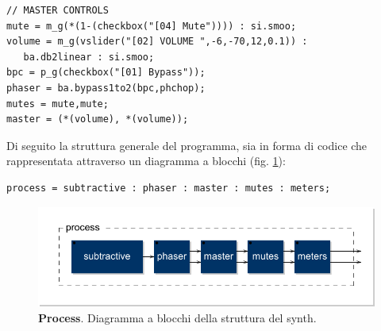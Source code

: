 \documentclass[
	a4paper,
	twocolumn
	]{article}
\begin{document}
\begin{lstlisting}
// MASTER CONTROLS
mute = m_g(*(1-(checkbox("[04] Mute")))) : si.smoo;
volume = m_g(vslider("[02] VOLUME ",-6,-70,12,0.1)) :
   ba.db2linear : si.smoo;
bpc = p_g(checkbox("[01] Bypass"));
phaser = ba.bypass1to2(bpc,phchop);
mutes = mute,mute;
master = (*(volume), *(volume));
\end{lstlisting}

Di seguito la struttura generale del programma, sia in forma di codice che
rappresentata attraverso un diagramma a blocchi (fig. \ref{process}):

\begin{lstlisting}
process = subtractive : phaser : master : mutes : meters;
\end{lstlisting}

\begin{figure}[h]
\begin{center}
\includegraphics[width=.47\textwidth]{img/process}
\caption{\textbf{Process}. Diagramma a blocchi della struttura del synth.}
\label{process}
\end{center}
\end{figure}



\end{document}
